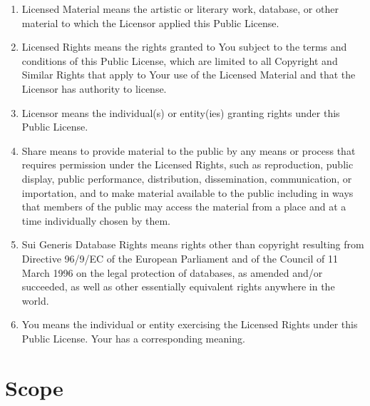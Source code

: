 \begin{enumerate}[label=\alph*.,ref=\alph*]
\item Licensed Material means the artistic or literary work, database,
  or other material to which the Licensor applied this Public License.

\item Licensed Rights means the rights granted to You subject to the
  terms and conditions of this Public License, which are limited to
  all Copyright and Similar Rights that apply to Your use of the
  Licensed Material and that the Licensor has authority to license.

\item Licensor means the individual(s) or entity(ies) granting rights
  under this Public License.

\item Share means to provide material to the public by any means or
  process that requires permission under the Licensed Rights, such as
  reproduction, public display, public performance, distribution,
  dissemination, communication, or importation, and to make material
  available to the public including in ways that members of the public
  may access the material from a place and at a time individually
  chosen by them.

\item Sui Generis Database Rights means rights other than copyright
  resulting from Directive 96/9/EC of the European Parliament and of
  the Council of 11 March 1996 on the legal protection of databases,
  as amended and/or succeeded, as well as other essentially equivalent
  rights anywhere in the world.

\item You means the individual or entity exercising the Licensed
  Rights under this Public License. Your has a corresponding meaning.
\end{enumerate}

\section{Scope}

